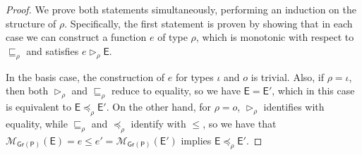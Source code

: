 \documentclass[submission,copyright]{eptcs}
\theoremstyle{definition}
\newcommand{\aleq}[1][]{\sqsubseteq_{#1}}
\newcommand{\ee}[1][I]{\rhd_{#1}}
\newcommand{\bezem}{\mathcal{M}_\mathsf{Gr(P)}}
\begin{document}
\begin{proof}
We prove both statements simultaneously, performing an induction on the structure
of $\rho$. Specifically, the first statement is proven by showing that in each
case we can construct a function $e$ of type $\rho$, which is monotonic with
respect to $\aleq[\rho]$ and satisfies $e \ee[\rho] \mathsf{E}$.

In the basis case, the construction of $e$ for types $\iota$ and $o$ is trivial.
Also, if $\rho = \iota$, then both $\ee[\rho]$ and $\aleq[\rho]$ reduce to equality,
so we have $\mathsf{E} = \mathsf{E}'$, which in this case is equivalent to
$\mathsf{E} \preceq_\rho \mathsf{E}'$. On the other hand, for
$\rho = o$, $\ee[\rho]$ identifies with equality, while $\aleq[\rho]$ and
$\preceq_{\rho}$ identify with $\leq$, so we have that
 $\bezem(\mathsf{E}) = e \leq e' = \bezem(\mathsf{E}')$ implies
 $\mathsf{E} \preceq_\rho \mathsf{E}'$.


\end{proof}
\end{document}
